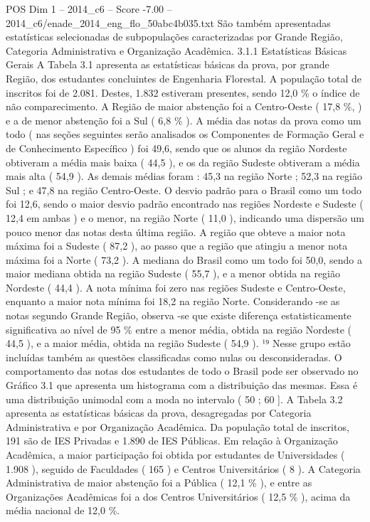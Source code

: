 \begin{textsample}{POS Dim 1 – 2014\_c6 – Score -7.00 – 2014\_c6/enade\_2014\_eng\_flo\_50abc4b035.txt}
São também apresentadas estatísticas selecionadas de subpopulações caracterizadas por Grande Região, Categoria Administrativa e Organização Acadêmica. 3.1.1 Estatísticas Básicas Gerais A Tabela 3.1 apresenta as estatísticas básicas da prova, por grande Região, dos estudantes concluintes de Engenharia Florestal.
A população total de inscritos foi de 2.081.
Destes, 1.832 estiveram presentes, sendo 12,0 \% o índice de não comparecimento.
A Região de maior abstenção foi a Centro-Oeste ( 17,8 \%, ) e a de menor abstenção foi a Sul ( 6,8 \% ).
A média das notas da prova como um todo ( nas seções seguintes serão analisados os Componentes de Formação Geral e de Conhecimento Específico ) foi 49,6, sendo que os alunos da região Nordeste obtiveram a média mais baixa ( 44,5 ), e os da região Sudeste obtiveram a média mais alta ( 54,9 ).
As demais médias foram : 45,3 na região Norte ; 52,3 na região Sul ; e 47,8 na região Centro-Oeste.
O desvio padrão para o Brasil como um todo foi 12,6, sendo o maior desvio padrão encontrado nas regiões Nordeste e Sudeste ( 12,4 em ambas ) e o menor, na região Norte ( 11,0 ), indicando uma dispersão um pouco menor das notas desta última região.
A região que obteve a maior nota máxima foi a Sudeste ( 87,2 ), ao passo que a região que atingiu a menor nota máxima foi a Norte ( 73,2 ).
A mediana do Brasil como um todo foi 50,0, sendo a maior mediana obtida na região Sudeste ( 55,7 ), e a menor obtida na região Nordeste ( 44,4 ).
A nota mínima foi zero nas regiões Sudeste e Centro-Oeste, enquanto a maior nota mínima foi 18,2 na região Norte.
Considerando -se as notas segundo Grande Região, observa -se que existe diferença estatisticamente significativa ao nível de 95 \% entre a menor média, obtida na região Nordeste ( 44,5 ), e a maior média, obtida na região Sudeste ( 54,9 ). ¹⁹ Nesse grupo estão incluídas também as questões classificadas como nulas ou desconsideradas.
O comportamento das notas dos estudantes de todo o Brasil pode ser observado no Gráfico 3.1 que apresenta um histograma com a distribuição das mesmas.
Essa é uma distribuição unimodal com a moda no intervalo ( 50 ; 60 ].
A Tabela 3.2 apresenta as estatísticas básicas da prova, desagregadas por Categoria Administrativa e por Organização Acadêmica.
Da população total de inscritos, 191 são de IES Privadas e 1.890 de IES Públicas.
Em relação à Organização Acadêmica, a maior participação foi obtida por estudantes de Universidades ( 1.908 ), seguido de Faculdades ( 165 ) e Centros Universitários ( 8 ).
A Categoria Administrativa de maior abstenção foi a Pública ( 12,1 \% ), e entre as Organizações Acadêmicas foi a dos Centros Universitários ( 12,5 \% ), acima da média nacional de 12,0 \%.

\end{textsample}
